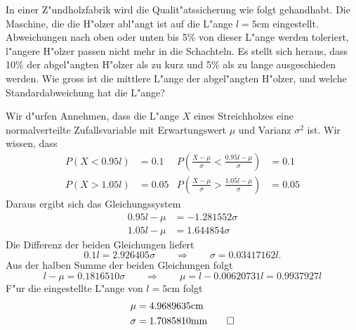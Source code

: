 In einer Z"undholzfabrik wird die Qualit"atssicherung wie folgt gehandhabt.
Die Maschine, die die H"olzer abl"angt ist auf die L"ange $l=5\text{cm}$ eingestellt.
Abweichungen nach oben oder unten bis 5\% von dieser L"ange werden toleriert,
l"angere H"olzer passen nicht mehr in die Schachteln. Es stellt sich
heraus, dass 10\% der abgel"angten H"olzer als zu kurz und 5\% als zu
lange ausgeschieden werden. Wie gross ist die mittlere L"ange der abgel"angten
H"olzer, und welche Standardabweichung hat die L"ange?

\begin{loesung}
Wir d"urfen Annehmen, dass die L"ange $X$ eines Streichholzes eine
normalverteilte Zufallsvariable mit Erwartungswert $\mu$ und Varianz
$\sigma^2$ ist. Wir wissen, dass
\begin{align*}
P(X<0.95 l)&=0.1&P\left(\frac{X-\mu}{\sigma}<\frac{0.95l-\mu}{\sigma}\right)&=0.1\\
P(X>1.05l)&=0.05&P\left(\frac{X-\mu}{\sigma}>\frac{1.05l-\mu}{\sigma}\right)&=0.05
\end{align*}
Daraus ergibt sich das Gleichungssystem
\begin{align*}
0.95l-\mu&=-1.281552\sigma\\
1.05l-\mu&=1.644854\sigma
\end{align*}
Die Differenz der beiden Gleichungen liefert
\[
0.1l=2.926405\sigma\qquad\Rightarrow\qquad
\sigma=0.03417162l.
\]
Aus der halben Summe der beiden Gleichungen folgt
\[
l-\mu=0.1816510\sigma\qquad\Rightarrow\qquad\mu=l-0.00620731l
=0.9937927l
\]
F"ur die eingestellte L"ange von $l=5\text{cm}$ folgt
\begin{align*}
\mu&=
4.9689635
\text{cm}
\\
\sigma&=
1.7085810
\text{mm}
\qedhere
\end{align*}
\end{loesung}

